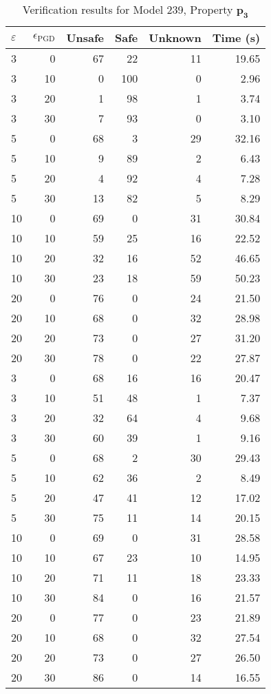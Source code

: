 \begin{table}[htbp]
\centering
\caption{Verification results for Model 239, Property $\mathbf{p_{3}}$}
\label{tab:model239_r3_part2}
\begin{tabular}{lrrrrr}
\toprule
$\varepsilon$ & $\epsilon_{\scriptscriptstyle\mathrm{PGD}}$ & Unsafe & Safe & Unknown & Time (s) \\
\midrule
3 & 0 & 67 & 22 & 11 & 19.65 \\
3 & 10 & 0 & 100 & 0 & 2.96 \\
3 & 20 & 1 & 98 & 1 & 3.74 \\
3 & 30 & 7 & 93 & 0 & 3.10 \\
5 & 0 & 68 & 3 & 29 & 32.16 \\
5 & 10 & 9 & 89 & 2 & 6.43 \\
5 & 20 & 4 & 92 & 4 & 7.28 \\
5 & 30 & 13 & 82 & 5 & 8.29 \\
10 & 0 & 69 & 0 & 31 & 30.84 \\
10 & 10 & 59 & 25 & 16 & 22.52 \\
10 & 20 & 32 & 16 & 52 & 46.65 \\
10 & 30 & 23 & 18 & 59 & 50.23 \\
20 & 0 & 76 & 0 & 24 & 21.50 \\
20 & 10 & 68 & 0 & 32 & 28.98 \\
20 & 20 & 73 & 0 & 27 & 31.20 \\
20 & 30 & 78 & 0 & 22 & 27.87 \\
3 & 0 & 68 & 16 & 16 & 20.47 \\
3 & 10 & 51 & 48 & 1 & 7.37 \\
3 & 20 & 32 & 64 & 4 & 9.68 \\
3 & 30 & 60 & 39 & 1 & 9.16 \\
5 & 0 & 68 & 2 & 30 & 29.43 \\
5 & 10 & 62 & 36 & 2 & 8.49 \\
5 & 20 & 47 & 41 & 12 & 17.02 \\
5 & 30 & 75 & 11 & 14 & 20.15 \\
10 & 0 & 69 & 0 & 31 & 28.58 \\
10 & 10 & 67 & 23 & 10 & 14.95 \\
10 & 20 & 71 & 11 & 18 & 23.33 \\
10 & 30 & 84 & 0 & 16 & 21.57 \\
20 & 0 & 77 & 0 & 23 & 21.89 \\
20 & 10 & 68 & 0 & 32 & 27.54 \\
20 & 20 & 73 & 0 & 27 & 26.50 \\
20 & 30 & 86 & 0 & 14 & 16.55 \\
\bottomrule
\end{tabular}
\end{table}
